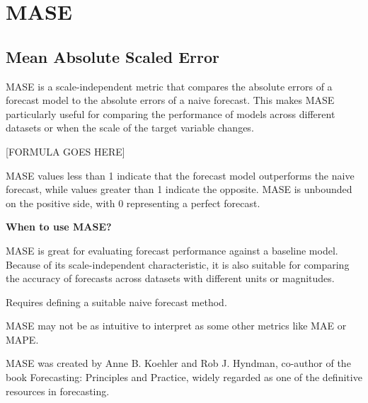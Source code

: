 \clearpage
\thispagestyle{regressionstyle}
\section{MASE}
\subsection{Mean Absolute Scaled Error}

MASE is a scale-independent metric that compares the absolute errors of a forecast model to the absolute errors of a naive forecast.
This makes MASE particularly useful for comparing the performance of models across different datasets or when the scale of the target variable changes.

\begin{center}
    [FORMULA GOES HERE]
\end{center}

MASE values less than 1 indicate that the forecast model outperforms the naive forecast, while values greater than 1 indicate the opposite.
MASE is unbounded on the positive side, with 0 representing a perfect forecast.

\textbf{When to use MASE?}

MASE is great for evaluating forecast performance against a baseline model. Because of its scale-independent characteristic, it is also suitable for comparing the accuracy
of forecasts across datasets with different units or magnitudes.

{
    \item Requires defining a suitable naive forecast method.    
    \item MASE may not be as intuitive to interpret as some other metrics like MAE or MAPE.
}

\clearpage
{}
{MASE was created by Anne B. Koehler and Rob J. Hyndman, co-author of the book Forecasting: Principles and Practice, widely regarded as one of the definitive resources in forecasting.}

